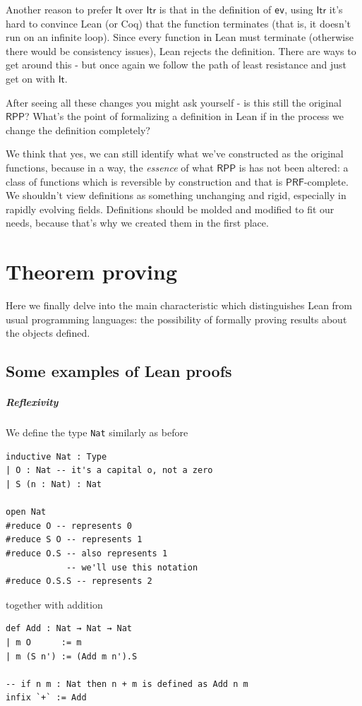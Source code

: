 \documentclass{book}
\theoremstyle{definition}
\theoremstyle{remark}
\theoremstyle{plain}
\newcommand{\RPP}{\mathsf{RPP}}
\newcommand{\rppIt}{\mathsf{It}}
\newcommand{\rppItr}{\mathsf{Itr}}
\newcommand{\PRF}{\mathsf{PRF}}
\begin{document}
\begin{itemize}
Another reason to prefer $\rppIt$ over $\rppItr$ is that in the definition of \lstinline{ev},
using $\rppItr$ it's hard to convince Lean (or Coq) that the function terminates (that is, it doesn't run on an infinite loop).
Since every function in Lean must terminate (otherwise there would be consistency issues), Lean rejects the definition.
There are ways to get around this - but once again we follow the path of least resistance and just get on with $\rppIt$.
\end{itemize}

After seeing all these changes you might ask yourself - is this still the original $\RPP$?
What's the point of formalizing a definition in Lean if in the process we change the definition completely?

We think that yes, we can still identify what we've constructed as the original functions,
because in a way, the \textit{essence} of what $\RPP$ is has not been altered:
a class of functions which is reversible by construction and that is $\PRF$-complete.
We shouldn't view definitions as something unchanging and rigid, especially in rapidly evolving fields.
Definitions should be molded and modified to fit our needs,
because that's why we created them in the first place.


\chapter{Theorem proving}

Here we finally delve into the main characteristic which distinguishes Lean from usual programming languages:
the possibility of formally proving results about the objects defined.

\section{Some examples of Lean proofs}

\paragraph{Reflexivity}

We define the type \lstinline{Nat} similarly as before
\begin{lstlisting}
inductive Nat : Type
| O : Nat -- it's a capital o, not a zero
| S (n : Nat) : Nat

open Nat
#reduce O -- represents 0
#reduce S O -- represents 1
#reduce O.S -- also represents 1
            -- we'll use this notation
#reduce O.S.S -- represents 2

\end{lstlisting}
together with addition
\begin{lstlisting}
def Add : Nat → Nat → Nat
| m O      := m
| m (S n') := (Add m n').S  

-- if n m : Nat then n + m is defined as Add n m
infix `+` := Add
\end{lstlisting}
  
\end{document}
